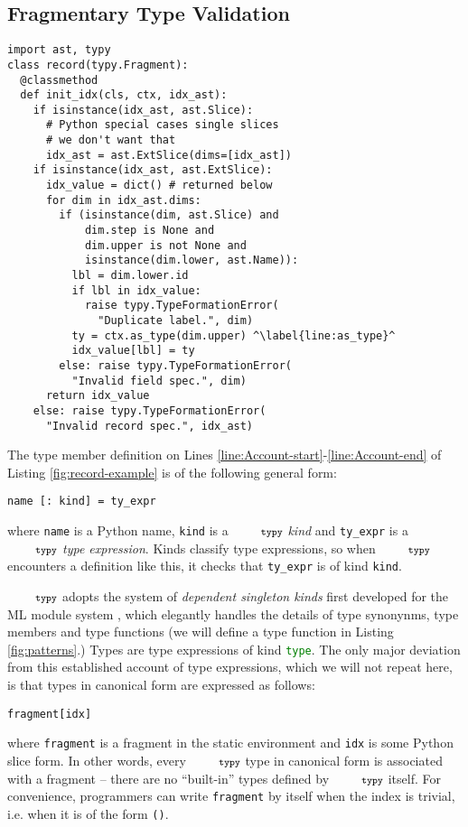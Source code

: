 \documentclass[10pt]{sigplanconf}
\newcommand{\typy}{\texttt{\footnotesize typy}}
\newcommand{\lip}[1]{\lstinline[language=Python,basicstyle=\ttfamily\footnotesize,morekeywords={with},deletendkeywords={tuple,buffer,map}]{#1}}
\begin{document}
\subsection{Fragmentary Type Validation}\label{sec:types}
\begin{codelisting}[t]
\vspace{-3px}
\begin{lstlisting}
import ast, typy
class record(typy.Fragment):
  @classmethod
  def init_idx(cls, ctx, idx_ast):
    if isinstance(idx_ast, ast.Slice):
      # Python special cases single slices
      # we don't want that
      idx_ast = ast.ExtSlice(dims=[idx_ast])
    if isinstance(idx_ast, ast.ExtSlice):
      idx_value = dict() # returned below
      for dim in idx_ast.dims:
        if (isinstance(dim, ast.Slice) and 
            dim.step is None and 
            dim.upper is not None and 
            isinstance(dim.lower, ast.Name)):
          lbl = dim.lower.id
          if lbl in idx_value:
            raise typy.TypeFormationError(
              "Duplicate label.", dim)
          ty = ctx.as_type(dim.upper) ^\label{line:as_type}^
          idx_value[lbl] = ty
        else: raise typy.TypeFormationError(
          "Invalid field spec.", dim)
      return idx_value
    else: raise typy.TypeFormationError(
      "Invalid record spec.", idx_ast)
\end{lstlisting}
\caption{Record type validation.}
\label{fig:type-validation}
\end{codelisting}

The type member definition on Lines \ref{line:Account-start}-\ref{line:Account-end} of Listing \ref{fig:record-example} is of the following general form:
\begin{lstlisting}[numbers=none]
name [: kind] = ty_expr
\end{lstlisting}
where \lip{name} is a Python name, \lip{kind} is a $\typy$ \emph{kind} and \lip{ty_expr} is a $\typy$ \emph{type expression}. Kinds classify type expressions, so when $\typy$ encounters a definition like this, it checks that \lip{ty_expr} is of kind \lip{kind}. 

$\typy$ adopts the system of \emph{dependent singleton kinds} first developed for the ML module system \cite{DBLP:conf/lfmtp/Crary09,pfpl}, which elegantly handles the details of type synonynms, type members and type functions (we will define a type function in Listing \ref{fig:patterns}.) Types are type expressions of kind \lip{type}. The only major deviation from this established account of type expressions, which we will not repeat here, is that types in canonical form are expressed as follows:
\begin{lstlisting}[numbers=none]
fragment[idx]
\end{lstlisting}
where \lip{fragment} is a fragment in the static environment and \lip{idx} is some Python slice form. In other words, every $\typy$ type in canonical form is associated with a fragment -- there are no ``built-in'' types defined by $\typy$ itself. For convenience, programmers can write \lip{fragment} by itself when the index is trivial, i.e. when it is of the form \lip{()}. 
\end{document}
